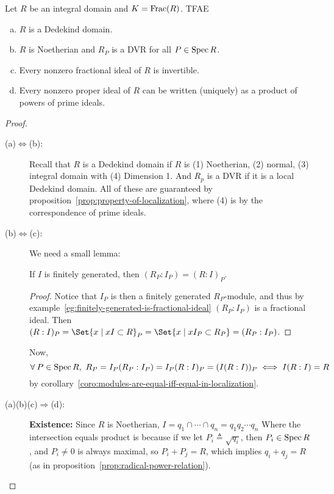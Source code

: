 \begin{theorem}
  Let $R$ be an integral domain and $K= \operatorname{Frac}(R)$. TFAE
  \begin{enumerate}[(a)]
    \item $R$ is a Dedekind domain.
    \item $R$ is Noetherian and $R_P$ is a DVR for all $P \in \operatorname{Spec} R$.
    \item Every nonzero fractional ideal of $R$ is invertible.
    \item Every nonzero proper ideal of $R$ can be written (uniquely) as a
      product of powers of prime ideals.
  \end{enumerate}

  \begin{proof} \mbox{}
    \begin{description}
      \item[\rm (a)$\Leftrightarrow$(b):]
        Recall that $R$ is a Dedekind domain if $R$ is (1) Noetherian,
        (2) normal, (3) integral domain with (4) Dimension 1.
        And $R_p$ is a DVR if it is a local Dedekind domain.
        All of these are guaranteed by proposition~\ref{prop:property-of-localization},
        where (4) is by the correspondence of prime ideals.
      \item[\rm (b)$\Leftrightarrow$(c):] We need a small lemma:
        \begin{lemma}
          If $I$ is finitely generated, then $(R_P : I_P) = (R: I)_P$.
          \begin{proof}
            Notice that $I_P$ is then a finitely generated $R_P$-module,
            and thus by example~\ref{eg:finitely-generated-is-fractional-ideal}
            $(R_P: I_P)$ is a fractional ideal.
            Then $(R: I)_P = \Set{ x \mid xI \subset R}_P
            = \Set{x \mid x I_P \subset R_P} = (R_P: I_P)$.
          \end{proof}
        \end{lemma}
        Now,
        \[ \forall P \in \Spec R, \ R_P = I_P(R_P : I_P)
          = I_P (R: I)_P = (I (R:I))_P \iff I (R:I) = R \]
        by corollary~\ref{coro:modules-are-equal-iff-equal-in-localization}.

      \item[\rm (a)(b)(c)$\Rightarrow$(d):] $ $ \\
        {\bf Existence:} Since $R$ is Noetherian,
        $I = q_1 \cap \cdots \cap q_n = q_1 q_2 \dotsm q_n$
        Where the intersection equals product is because
        if we let $P_i \triangleq \sqrt{q_i}$, then $P_i \in \operatorname{Spec} R$,
        and $P_i \ne 0$ is always maximal, so $P_i + P_j = R$,
        which implies $q_i + q_j = R$ (as in proposition~\ref{prop:radical-power-relation}).


\end{description}
\end{proof}
\end{theorem}
